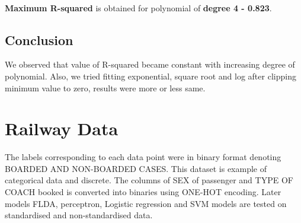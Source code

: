 \documentclass[12pt,journal,compsoc]{IEEEtran}
\begin{document}
\\
\noindent \textbf{Maximum R-squared} is obtained for polynomial of \textbf{degree 4 - 0.823}.\\

\subsection{Conclusion}
We observed that value of R-squared became constant with increasing degree of polynomial. Also, we tried fitting exponential, square root and log after clipping minimum value to zero, results were more or less same.


\section{Railway Data}
\noindent The labels corresponding to each data point were in binary format denoting BOARDED AND NON-BOARDED CASES. This dataset is example of categorical data and discrete. The columns of SEX of passenger and TYPE OF COACH booked is converted into binaries using ONE-HOT encoding. Later models FLDA, perceptron, Logistic regression and SVM models are tested on standardised and non-standardised data.  
\end{document}
